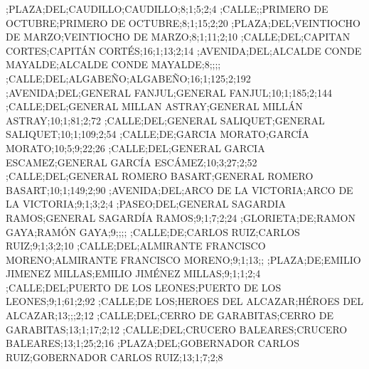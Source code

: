 \begin{itemize}
\begin{tiny}
;PLAZA;DEL;CAUDILLO;CAUDILLO;8;1;5;2;4
;CALLE;;PRIMERO DE OCTUBRE;PRIMERO DE OCTUBRE;8;1;15;2;20
;PLAZA;DEL;VEINTIOCHO DE MARZO;VEINTIOCHO DE MARZO;8;1;11;2;10
;CALLE;DEL;CAPITAN CORTES;CAPITÁN CORTÉS;16;1;13;2;14
;AVENIDA;DEL;ALCALDE CONDE MAYALDE;ALCALDE CONDE MAYALDE;8;;;;
;CALLE;DEL;ALGABEÑO;ALGABEÑO;16;1;125;2;192
;AVENIDA;DEL;GENERAL FANJUL;GENERAL FANJUL;10;1;185;2;144
;CALLE;DEL;GENERAL MILLAN ASTRAY;GENERAL MILLÁN ASTRAY;10;1;81;2;72
;CALLE;DEL;GENERAL SALIQUET;GENERAL SALIQUET;10;1;109;2;54
;CALLE;DE;GARCIA MORATO;GARCÍA MORATO;10;5;9;22;26
;CALLE;DEL;GENERAL GARCIA ESCAMEZ;GENERAL GARCÍA ESCÁMEZ;10;3;27;2;52
;CALLE;DEL;GENERAL ROMERO BASART;GENERAL ROMERO BASART;10;1;149;2;90
;AVENIDA;DEL;ARCO DE LA VICTORIA;ARCO DE LA VICTORIA;9;1;3;2;4
;PASEO;DEL;GENERAL SAGARDIA RAMOS;GENERAL SAGARDÍA RAMOS;9;1;7;2;24
;GLORIETA;DE;RAMON GAYA;RAMÓN GAYA;9;;;;
;CALLE;DE;CARLOS RUIZ;CARLOS RUIZ;9;1;3;2;10
;CALLE;DEL;ALMIRANTE FRANCISCO MORENO;ALMIRANTE FRANCISCO MORENO;9;1;13;;
;PLAZA;DE;EMILIO JIMENEZ MILLAS;EMILIO JIMÉNEZ MILLAS;9;1;1;2;4
;CALLE;DEL;PUERTO DE LOS LEONES;PUERTO DE LOS LEONES;9;1;61;2;92
;CALLE;DE LOS;HEROES DEL ALCAZAR;HÉROES DEL ALCAZAR;13;;;2;12
;CALLE;DEL;CERRO DE GARABITAS;CERRO DE GARABITAS;13;1;17;2;12
;CALLE;DEL;CRUCERO BALEARES;CRUCERO BALEARES;13;1;25;2;16
;PLAZA;DEL;GOBERNADOR CARLOS RUIZ;GOBERNADOR CARLOS RUIZ;13;1;7;2;8

\end{tiny}
\end{itemize}
